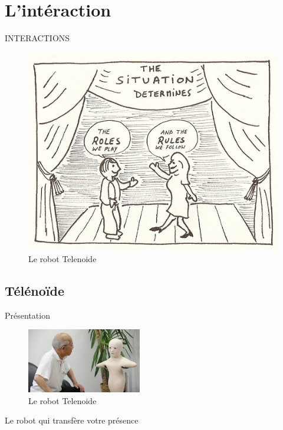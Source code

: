 \documentclass{beamer}
\begin{document}
\section{L'intéraction}
\begin{frame}{INTERACTIONS}
  \begin{figure}
    \centering
    \includegraphics[width=\textwidth]{data/interaction}
    \caption{Le robot Telenoide}
  \end{figure}
\end{frame}

\subsection{Télénoïde}
\begin{frame}{Présentation}
  \begin{figure}
    \centering
    \includegraphics[width=50mm]{data/telenoid}
    \caption{Le robot Telenoide}
  \end{figure}
  Le robot qui transfère votre présence
\end{frame}
\end{document}
